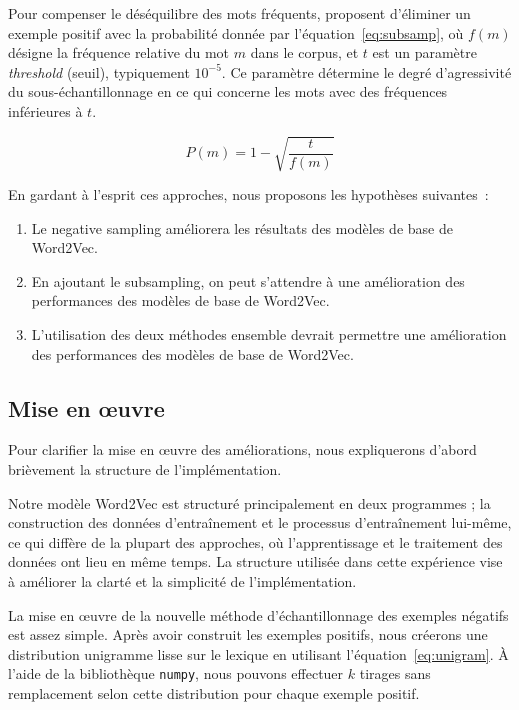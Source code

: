 \documentclass[12pt]{article}
\begin{document}
Pour compenser le déséquilibre des mots fréquents, \cite{DBLP:conf/nips/MikolovSCCD13} proposent d'éliminer un exemple positif avec la probabilité donnée par l'équation~\ref{eq:subsamp}, où $f(m)$ désigne la fréquence relative du mot $m$ dans le corpus, et $t$ est un paramètre \textit{threshold} (seuil), typiquement $10^{-5}$. Ce paramètre détermine le degré d'agressivité du sous-échantillonnage en ce qui concerne les mots avec des fréquences inférieures à $t$.

\begin{equation}\label{eq:subsamp}
P(m) = 1 - \sqrt{\frac{t}{f(m)}}
\end{equation}

En gardant à l'esprit ces approches, nous proposons les hypothèses suivantes :

\begin{enumerate}
    \item Le negative sampling améliorera les résultats des modèles de base de Word2Vec.
    \item En ajoutant le subsampling, on peut s'attendre à une amélioration des performances des modèles de base de Word2Vec.
    \item L'utilisation des deux méthodes ensemble devrait permettre une amélioration des performances des modèles de base de Word2Vec.
\end{enumerate}

\subsection{Mise en œuvre} \label{mise en œuvre-1}

Pour clarifier la mise en œuvre des améliorations, nous expliquerons d'abord brièvement la structure de l'implémentation. 

Notre modèle Word2Vec est structuré principalement en deux programmes ; la construction des données d'entraînement et le processus d'entraînement lui-même, ce qui diffère de la plupart des approches, où l'apprentissage et le traitement des données ont lieu en même temps. La structure utilisée dans cette expérience vise à améliorer la clarté et la simplicité de l'implémentation.

La mise en œuvre de la nouvelle méthode d'échantillonnage des exemples négatifs est assez simple. Après avoir construit les exemples positifs, nous créerons une distribution unigramme lisse sur le lexique en utilisant l'équation~\ref{eq:unigram}. À l'aide de la bibliothèque \texttt{numpy}, nous pouvons effectuer $k$ tirages sans remplacement selon cette distribution pour chaque exemple positif.
\end{document}
